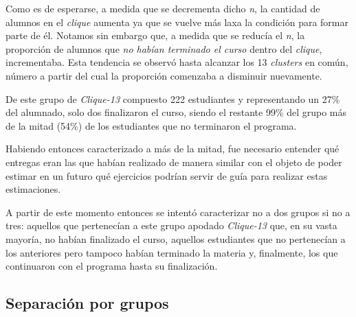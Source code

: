 \documentclass[11pt,a4paper,twoside,openany]{tesis}
\begin{document}
Como es de esperarse, a medida que se decrementa dicho \emph{n}, la cantidad de alumnos en el \emph{clique} aumenta ya que se vuelve más laxa la condición para formar parte de él. Notamos sin embargo que, a medida que se reducía el \emph{n}, la proporción de alumnos que \emph{no habían terminado el curso} dentro del \emph{clique}, incrementaba.  Esta tendencia se observó hasta alcanzar los 13 \emph{clusters} en común, número a partir del cual la proporción comenzaba a disminuir nuevamente.

De este grupo de \emph{Clique-13} compuesto 222 estudiantes y representando un 27\% del alumnado, solo dos finalizaron el curso, siendo el restante 99\% del grupo más de la mitad (54\%) de los estudiantes que no terminaron el programa. 

Habiendo entonces caracterizado a más de la mitad, fue necesario entender qué entregas eran las que habían realizado de manera similar con el objeto de poder estimar en un futuro qué ejercicios podrían servir de guía para realizar estas estimaciones. 

A partir de este momento entonces se intentó caracterizar no a dos grupos si no a tres: aquellos que pertenecían a este grupo apodado \emph{Clique-13} que, en su vasta mayoría, no habían finalizado el curso, aquellos estudiantes que no pertenecían a los anteriores pero tampoco habían terminado la materia y, finalmente, los que continuaron con el programa hasta su finalización.

\subsection{Separación por grupos}\textbf{ }
\end{document}

